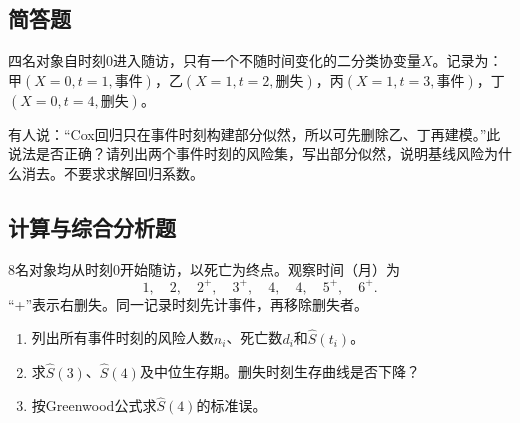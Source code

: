 \par\addvspace{8pt}\noindent\begin{minipage}{\linewidth}

\subsection{简答题}


四名对象自时刻0进入随访，只有一个不随时间变化的二分类协变量\(X\)。记录为：甲\((X=0,t=1,\text{事件})\)，乙\((X=1,t=2,\text{删失})\)，丙\((X=1,t=3,\text{事件})\)，丁\((X=0,t=4,\text{删失})\)。

有人说：“Cox回归只在事件时刻构建部分似然，所以可先删除乙、丁再建模。”此说法是否正确？请列出两个事件时刻的风险集，写出部分似然，说明基线风险为什么消去。不要求求解回归系数。


\end{minipage}\par\vspace{5pt}

\par\addvspace{8pt}\noindent\begin{minipage}{\linewidth}

\subsection{计算与综合分析题}


8名对象均从时刻0开始随访，以死亡为终点。观察时间（月）为
\[1,\quad2,\quad2^+,\quad3^+,\quad4,\quad4,\quad5^+,\quad6^+.\]
“+”表示右删失。同一记录时刻先计事件，再移除删失者。
\begin{enumerate}
\item 列出所有事件时刻的风险人数\(n_i\)、死亡数\(d_i\)和\(\hat S(t_i)\)。
\item 求\(\hat S(3)\)、\(\hat S(4)\)及中位生存期。删失时刻生存曲线是否下降？
\item 按Greenwood公式求\(\hat S(4)\)的标准误。
\end{enumerate}


\end{minipage}\par\vspace{5pt}


